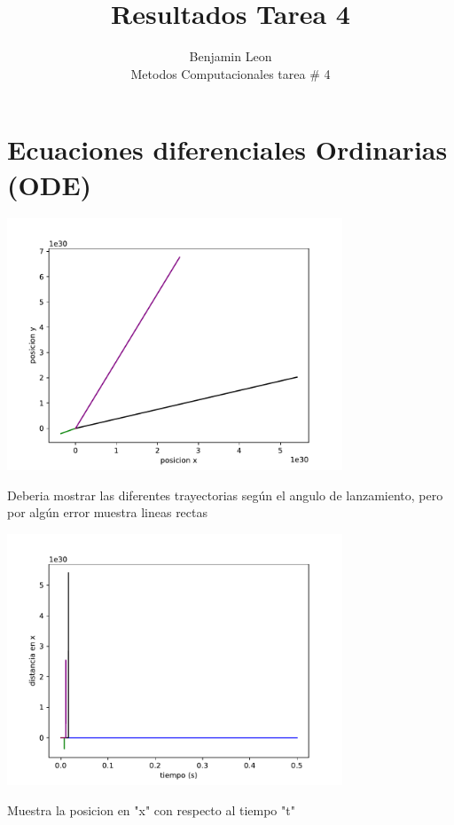 \documentclass[12pt]{article}
\begin{document}
 

 
\title{Resultados Tarea 4}
\author{Benjamin Leon\\
Metodos Computacionales tarea \# 4} 
\maketitle


\section{Ecuaciones diferenciales Ordinarias (ODE)}
\begin{centering}
\includegraphics[width=0.75\textwidth]{grafsODE.pdf}

Deberia mostrar las diferentes trayectorias seg\'un el angulo de lanzamiento, pero por alg\'un error muestra lineas rectas

\includegraphics[width=0.75\textwidth]{grafsODE2.pdf}

Muestra la posicion en "x" con respecto al tiempo "t"
\end{centering}
\end{document}

